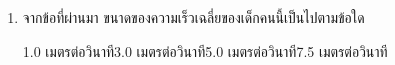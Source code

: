 \begin{enumerate}
	\item \runningj  \nonet จากข้อที่ผ่านมา  ขนาดของความเร็วเฉลี่ยของเด็กคนนี้เป็นไปตามข้อใด
	\begin{2c}
		{1.0  เมตรต่อวินาที}{3.0  เมตรต่อวินาที}{5.0  เมตรต่อวินาที}{7.5  เมตรต่อวินาที}
	\end{2c}
\end{enumerate}

